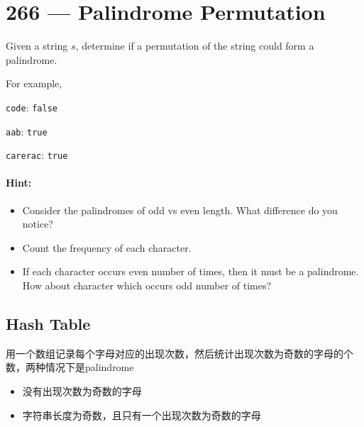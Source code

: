\section{266 --- Palindrome Permutation}
Given a string $s$, determine if a permutation of the string could form a palindrome.
\par
For example,
\par
\texttt{code}: \texttt{false}
\par
\texttt{aab}: \texttt{true}
\par
\texttt{carerac}: \texttt{true}

\paragraph{Hint:}

\begin{itemize}
\item Consider the palindromes of odd vs even length. What difference do you notice?
\item Count the frequency of each character.
\item If each character occurs even number of times, then it must be a palindrome. How about character which occurs odd number of times?
\end{itemize}
\subsection{Hash Table}
用一个数组记录每个字母对应的出现次数，然后统计出现次数为奇数的字母的个数，两种情况下是palindrome
\begin{itemize}
\item 没有出现次数为奇数的字母
\item 字符串长度为奇数，且只有一个出现次数为奇数的字母
\end{itemize}